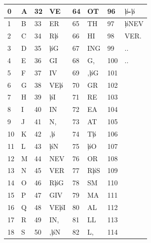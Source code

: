 \documentclass{article}[12pt]
\begin{document}
\begin{table}[htbp]
  \centering
\begin{tabular}{||p{0.3 in}|p{0.6 in}||p{0.3 in}|p{0.6 in}||p{0.3 in}|p{0.6 in}||p{0.3 in}|p{0.6 in}||} \hline
0  & A          & 32 & VE             & 64 & OT         & 96  & $\not b$-$\not b$   \\ \hline
1  & B          & 33 & ER             & 65 & TH         & 97  & $\not b$NEV         \\ \hline
2  & C          & 34 & R$\not b$      & 66 & HI         & 98  & VER.                \\ \hline
3  & D          & 35 & $\not b$G      & 67 & ING        & 99  & ..                  \\ \hline
4  & E          & 36 & GI             & 68 & G,         & 100 & ..                  \\ \hline
5  & F          & 37 & IV             & 69 & ,$\not b$G & 101 &                     \\ \hline
6  & G          & 38 & VE$\not b$     & 70 & GR         & 102 &                     \\ \hline
7  & H          & 39 & $\not b$I      & 71 & RE         & 103 &   \\ \hline
8  & I          & 40 & IN             & 72 & EA         & 104 &   \\ \hline
9  & J          & 41 & N,             & 73 & AT         & 105 &   \\ \hline
10 & K          & 42 & ,$\not b$      & 74 & T$\not b$  & 106 &   \\ \hline
11 & L          & 43 & $\not b$N      & 75 & $\not b$O  & 107 &   \\ \hline
12 & M          & 44 & NEV            & 76 & OR         & 108 &   \\ \hline
13 & N          & 45 & VER            & 77 & R$\not b$S & 109 &   \\ \hline
14 & O          & 46 & R$\not b$G     & 78 & SM         & 110 &   \\ \hline
15 & P          & 47 & GIV            & 79 & MA         & 111 &   \\ \hline
16 & Q          & 48 & VE$\not b$I    & 80 & AL         & 112 &   \\ \hline
17 & R          & 49 & IN,            & 81 & LL         & 113 &   \\ \hline
18 & S          & 50 & ,$\not b$N     & 82 & L,         & 114 &   \\ \hline

\end{tabular}
\end{table}
\end{document}
